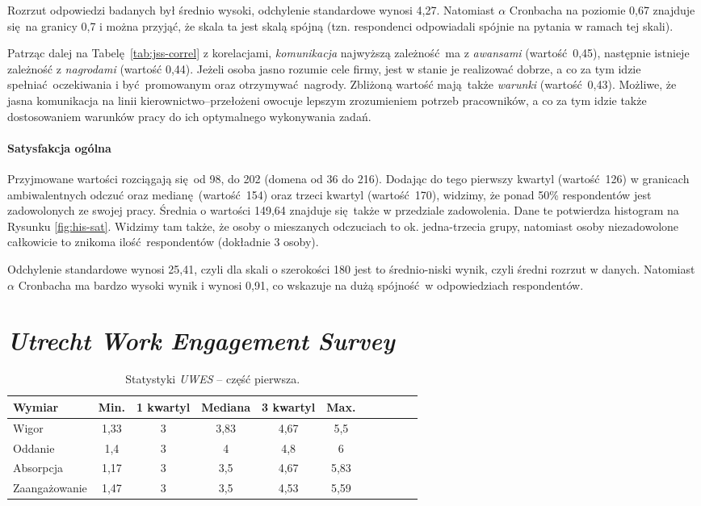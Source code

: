 Rozrzut odpowiedzi badanych był średnio wysoki, odchylenie standardowe wynosi 4,27. Natomiast $\alpha$ Cronbacha na poziomie 0,67 znajduje się na granicy 0,7 i można przyjąć, że skala ta jest skalą spójną (tzn. respondenci odpowiadali spójnie na pytania w ramach tej skali).

Patrząc dalej na Tabelę \ref{tab:jss-correl} z korelacjami, \textit{komunikacja} najwyższą zależność ma z \textit{awansami} (wartość 0,45), następnie istnieje zależność z \textit{nagrodami} (wartość 0,44). Jeżeli osoba jasno rozumie cele firmy, jest w stanie je realizować dobrze, a co za tym idzie spełniać oczekiwania i być promowanym oraz otrzymywać nagrody. Zbliżoną wartość mają także \textit{warunki} (wartość 0,43). Możliwe, że jasna komunikacja na linii
kierownictwo--przełożeni owocuje lepszym zrozumieniem potrzeb pracowników, a co za tym idzie także dostosowaniem warunków pracy do ich optymalnego wykonywania zadań.

\paragraph{Satysfakcja ogólna}
Przyjmowane wartości rozciągają się od 98, do 202 (domena od 36 do 216). Dodając do tego pierwszy kwartyl (wartość 126) w granicach ambiwalentnych odczuć oraz medianę (wartość 154) oraz trzeci kwartyl (wartość 170), widzimy, że ponad 50\% respondentów jest zadowolonych ze swojej pracy. Średnia o wartości 149,64 znajduje się także w przedziale zadowolenia. Dane te potwierdza histogram na Rysunku \ref{fig:his-sat}. Widzimy tam także, że osoby o mieszanych odczuciach to ok.
jedna-trzecia grupy, natomiast osoby niezadowolone całkowicie to znikoma ilość respondentów (dokładnie 3 osoby).

Odchylenie standardowe wynosi 25,41, czyli dla skali o szerokości 180 jest to średnio-niski wynik, czyli średni rozrzut w danych. Natomiast $\alpha$ Cronbacha ma bardzo wysoki wynik i wynosi 0,91, co wskazuje na dużą spójność w odpowiedziach respondentów.

\section{\emph{Utrecht Work Engagement Survey}}

\begin{table}[h!]
\begin{center}
\begin{tabular}{l | c c c c c c c c c c}
Wymiar & Min. & 1 kwartyl & Mediana & 3 kwartyl & Max.\\ \hline \hline
Wigor & 1,33 & 3 & 3,83 & 4,67 & 5,5 \\
Oddanie & 1,4 & 3 & 4 & 4,8 & 6 \\
Absorpcja & 1,17 & 3 & 3,5 & 4,67 & 5,83 \\ \hline
Zaangażowanie & 1,47 & 3 & 3,5 & 4,53 & 5,59 \\
\end{tabular}
\end{center}
\caption{Statystyki \emph{UWES} -- część pierwsza.}
\label{tab:uwes-stats-1}
\end{table}

